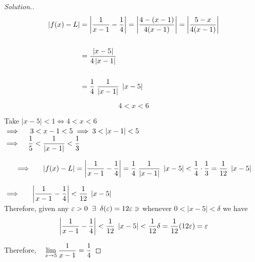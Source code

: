 \documentclass[11pt,a4paper]{article}
\theoremstyle{definition}
\newenvironment{solution}
  {\renewcommand{\qedsymbol}{}\begin{proof}[\textit{Solution}.]}
  {\end{proof}}
\begin{document}
\begin{solution}
\begin{align*}
\left|f(x) - L\right| & = \left|\dfrac{1}{x - 1} - \dfrac{1}{4}\right| = \left|\dfrac{4 - (x - 1)}{4(x - 1)}\right| = \left|\dfrac{5 - x}{4(x - 1)}\right|\\\\
& = \dfrac{\left|x - 5\right|
}{4\left|x - 1\right|
}\\\\
& = \dfrac{1}{4}\hspace{0.1cm} \dfrac{1}{
\left|x - 1\right|}\hspace{0.1cm}\left|x - 5\right|
\end{align*}

$$4 < x < 6$$

Take $\left|x - 5\right| < 1 \iff 4 < x < 6$\\

$\implies\hspace{0.4cm} 3 < x - 1 < 5 \implies 3 < \left|x - 1\right|< 5$\\

$\implies\hspace{0.3cm} \dfrac{1}{5} < \dfrac{1}{\left|x - 1\right|
} < \dfrac{1}{3}$


$$\implies \hspace{0.5cm}\left|f(x) - L\right| = \left|\dfrac{1}{x - 1} - \dfrac{1}{4}\right| = \dfrac{1}{4}\hspace{0.1cm}\dfrac{1}{\left|x - 1\right|
}\hspace{0.1cm}\left|x - 5\right|<\dfrac{1}{4}\cdot\dfrac{1}{3}= \dfrac{1}{12}\hspace{0.1cm}\left|x -5\right|$$

$\implies\hspace{0.5cm} \left|\dfrac{1}{x - 1} - \dfrac{1}{4}\right| < \dfrac{1}{12}\hspace{0.1cm}\left|x - 5\right|$\\

Therefore, given any $\varepsilon > 0 \hspace{0.2cm} \exists \hspace{0.2cm} \delta (\varepsilon)  = 12\varepsilon \ni$ whenever $ 0 < \left|x - 5\right| < \delta$ we have 
$$\left|\dfrac{1}{x - 1}- \dfrac{1}{4}\right| < \dfrac{1}{12}\hspace{0.1cm}\left|x - 5\right| < \dfrac{1}{12}\delta = \frac{1}{12}(12\varepsilon) = \varepsilon$$

Therefore, $\hspace{0.3cm} \lim\limits_{x \rightarrow 5} \dfrac{1}{x - 1} = \dfrac{1}{4}$
\end{solution}
\end{document}
